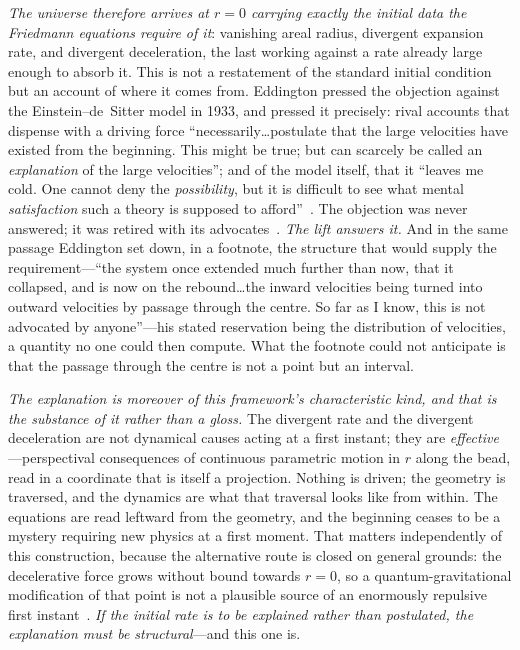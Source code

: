 \documentclass[11pt,a4paper]{article}
\theoremstyle{plain}
\theoremstyle{definition}
\theoremstyle{remark}
\begin{document}
\emph{The universe therefore arrives at $r=0$ carrying exactly the initial data the Friedmann equations require
of it}: vanishing areal radius, divergent expansion rate, and divergent deceleration, the last working against a
rate already large enough to absorb it. This is not a restatement of the standard initial condition but an
account of where it comes from. Eddington pressed the objection against the Einstein--de~Sitter model in 1933,
and pressed it precisely: rival accounts that dispense with a driving force ``necessarily\ldots postulate that
the large velocities have existed from the beginning. This might be true; but can scarcely be called an
\emph{explanation} of the large velocities''; and of the model itself, that it ``leaves me cold. One cannot deny
the \emph{possibility}, but it is difficult to see what mental \emph{satisfaction} such a theory is supposed to
afford''~\cite{Eddington1933}. The objection was never answered; it was retired with its
advocates~\cite{JanzenEinsteinConsiderations}. \emph{The lift answers it.} And in the same passage Eddington set
down, in a footnote, the structure that would supply the requirement---``the system once extended much further
than now, that it collapsed, and is now on the rebound\ldots the inward velocities being turned into outward
velocities by passage through the centre. So far as I know, this is not advocated by anyone''---his stated
reservation being the distribution of velocities, a quantity no one could then compute. What the footnote could
not anticipate is that the passage through the centre is not a point but an interval.

\emph{The explanation is moreover of this framework's characteristic kind, and that is the substance of it rather
than a gloss.} The divergent rate and the divergent deceleration are not dynamical causes acting at a first
instant; they are \emph{effective}---perspectival consequences of continuous parametric motion in $r$ along the
bead, read in a coordinate that is itself a projection. Nothing is driven; the geometry is traversed, and the
dynamics are what that traversal looks like from within. The equations are read leftward from the geometry, and
the beginning ceases to be a mystery requiring new physics at a first moment. That matters independently of this
construction, because the alternative route is closed on general grounds: the decelerative force grows without
bound towards $r=0$, so a quantum-gravitational modification of that point is not a plausible source of an
enormously repulsive first instant~\cite{JanzenEinsteinConsiderations}. \emph{If the initial rate is to be
explained rather than postulated, the explanation must be structural}---and this one is.
\end{document}
